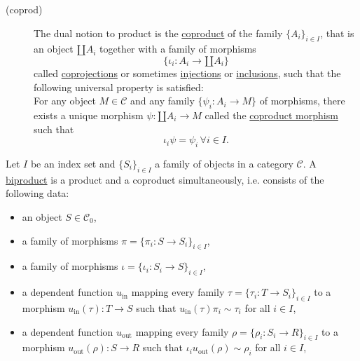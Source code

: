 \begin{definition}
\begin{description}
\begin{tikzcd}
\end{tikzcd}
\item[(coprod)] The dual notion to product is the \ul{coproduct} of the family $\{A_{i}\}_{i\in I}$, that is an object $\amalg A_{i}$ together with
a family of morphisms
\[
\{ \iota_{i} : A_{i} \rightarrow \amalg A_{i} \}
\]
called \ul{coprojections} or sometimes \ul{injections} or \ul{inclusions}, such that the following universal property is satisfied:\\
For any object $M \in \mathcal{C}$ and any family $\{ \psi_{i} : A_{i} \rightarrow M \}$ of morphisms, there exists a unique
morphism $\psi : \amalg A_{i} \rightarrow M$ called the \ul{coproduct morphism} such that
\[
\iota_{i} \psi = \psi_{i} \, \forall i \in I.
\]
\end{description}
\end{definition}

\begin{definition}[Biproduct]\label{def:biproduct}
Let $I$ be an index set and $\{S_{i}\}_{i\in I}$ a family of objects in a category $\mathcal{C}$.
A \ul{biproduct} is a product and a coproduct simultaneously, i.e. consists of the following data:
\begin{itemize}
\item an object $S \in \mathcal{C}_{0}$,
\item a family of morphisms $\pi = \{ \pi_{i} : S \rightarrow S_{i} \}_{i\in I}$,
\item a family of morphisms $\iota = \{ \iota_{i} : S_{i} \rightarrow S \}_{i\in I}$,
\item a dependent function $u_{\text{in}}$ mapping every family $\tau = \{ \tau_{i} : T \rightarrow S_{i} \}_{i\in I}$ to a morphism
$u_{\text{in}}(\tau) : T \rightarrow S$ such that $u_{\text{in}}(\tau) \pi_{i} \sim \tau_{i}$ for all $i \in I$,
\item a dependent function $u_{\text{out}}$ mapping every family $\rho = \{ \rho_{i} : S_{i} \rightarrow R \}_{i\in I}$ to a morphism
$u_{\text{out}}(\rho) : S \rightarrow R$ such that $\iota_{i} u_{\text{out}}(\rho) \sim \rho_{i}$ for all $i \in I$,
\end{itemize}
\end{definition}

